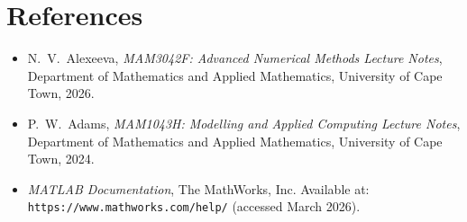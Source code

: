 \documentclass[12pt]{article}
\begin{document}

\section*{References}

\begin{itemize}

\item N.\ V.\ Alexeeva, \textit{MAM3042F: Advanced Numerical Methods Lecture Notes}, 
Department of Mathematics and Applied Mathematics, University of Cape Town, 2026.

\item P.\ W.\ Adams, \textit{MAM1043H: Modelling and Applied Computing Lecture Notes}, 
Department of Mathematics and Applied Mathematics, University of Cape Town, 2024.

\item \textit{MATLAB Documentation}, The MathWorks, Inc. Available at: \\ \texttt{https://www.mathworks.com/help/} (accessed March 2026).

\end{itemize}
\end{document}
